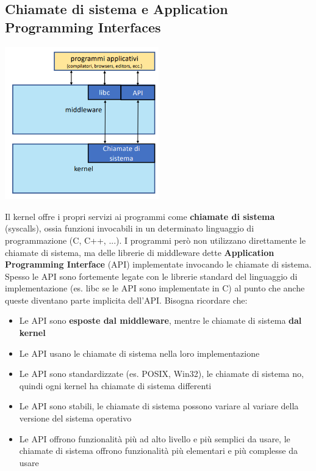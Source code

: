 \documentclass[12pt]{article}
\begin{document}
\subsection{Chiamate di sistema e Application Programming Interfaces}
\begin{center}
    \includegraphics[width = 0.50\textwidth]{Images/4.PNG}
\end{center}
Il kernel offre i propri servizi ai programmi come \textbf{chiamate di sistema} (syscalls), ossia funzioni invocabili in un determinato linguaggio di programmazione (C, C++, ...).
I programmi però non utilizzano direttamente le chiamate di sistema, ma delle librerie di middleware dette \textbf{Application Programming Interface} (API) implementate invocando le chiamate di sistema.
Spesso le API sono fortemente legate con le librerie standard del linguaggio di implementazione (es. libc se le API sono implementate in C) al punto che anche queste diventano parte implicita dell'API.
Bisogna ricordare che:
\begin{itemize}
    \item Le API sono \textbf{esposte dal middleware}, mentre le chiamate di sistema \textbf{dal kernel}
    \item Le API usano le chiamate di sistema nella loro implementazione
    \item Le API sono standardizzate (es. POSIX, Win32), le chiamate di sistema no, quindi ogni kernel ha chiamate di sistema differenti
    \item Le API sono stabili, le chiamate di sistema possono variare al variare della versione del sistema operativo
    \item Le API offrono funzionalità più ad alto livello e più semplici da usare, le chiamate di sistema offrono funzionalità più elementari e più complesse da usare
\end{itemize}
\end{document}

